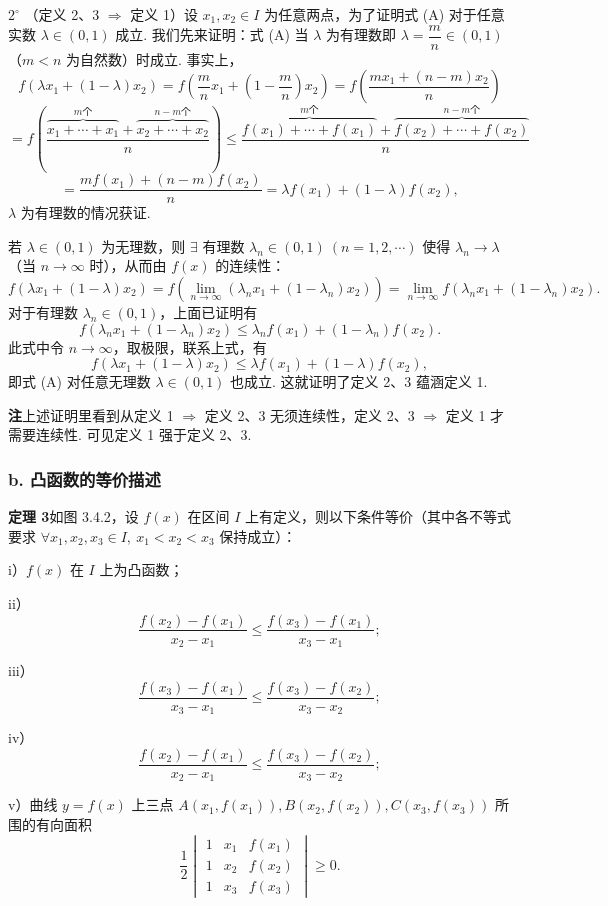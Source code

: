 \documentclass[UTF8, 12pt, fontset=fandol, oneside]{ctexart}
\begin{document}
$2^\circ$ （定义 2、3 $\Rightarrow$ 定义 1）设 $x_1,x_2\in I$ 为任意两点，为了证明式 (A) 对于任意实数 $\lambda\in(0,1)$ 成立. 我们先来证明：式 (A) 当 $\lambda$ 为有理数即 $\lambda=\dfrac mn\in(0,1)$（$m<n$ 为自然数）时成立. 事实上，
\[
  f(\lambda x_1+(1-\lambda)x_2)
  =f\left(\frac mn x_1+\left(1-\frac mn\right)x_2\right)
  =f\left(\frac{mx_1+(n-m)x_2}{n}\right)
\]
\[
  =f\left(\frac{\overbrace{x_1+\cdots+x_1}^{m\text{个}}+\overbrace{x_2+\cdots+x_2}^{n-m\text{个}}}{n}\right)
  \le\frac{\overbrace{f(x_1)+\cdots+f(x_1)}^{m\text{个}}+\overbrace{f(x_2)+\cdots+f(x_2)}^{n-m\text{个}}}{n}
\]
\[
  =\frac{mf(x_1)+(n-m)f(x_2)}{n}
  =\lambda f(x_1)+(1-\lambda)f(x_2),
\]
$\lambda$ 为有理数的情况获证.

若 $\lambda\in(0,1)$ 为无理数，则 $\exists$ 有理数 $\lambda_n\in(0,1)\ (n=1,2,\cdots)$ 使得 $\lambda_n\to\lambda$（当 $n\to\infty$ 时），从而由 $f(x)$ 的连续性：
\[
  f(\lambda x_1+(1-\lambda)x_2)
  =f\left(\lim_{n\to\infty}(\lambda_nx_1+(1-\lambda_n)x_2)\right)
  =\lim_{n\to\infty}f(\lambda_nx_1+(1-\lambda_n)x_2).
\]
对于有理数 $\lambda_n\in(0,1)$，上面已证明有
\[
  f(\lambda_nx_1+(1-\lambda_n)x_2)
  \le \lambda_n f(x_1)+(1-\lambda_n)f(x_2).
\]
此式中令 $n\to\infty$，取极限，联系上式，有
\[
  f(\lambda x_1+(1-\lambda)x_2)
  \le \lambda f(x_1)+(1-\lambda)f(x_2),
\]
即式 (A) 对任意无理数 $\lambda\in(0,1)$ 也成立. 这就证明了定义 2、3 蕴涵定义 1.

\noindent\textbf{注}\quad 上述证明里看到从定义 1 $\Rightarrow$ 定义 2、3 无须连续性，定义 2、3 $\Rightarrow$ 定义 1 才需要连续性. 可见定义 1 强于定义 2、3.

\subsubsection*{b. 凸函数的等价描述}

\noindent\textbf{定理 3}\quad 如图 3.4.2，设 $f(x)$ 在区间 $I$ 上有定义，则以下条件等价（其中各不等式要求 $\forall x_1,x_2,x_3\in I,\ x_1<x_2<x_3$ 保持成立）：

i）$f(x)$ 在 $I$ 上为凸函数；

ii）
\[
  \frac{f(x_2)-f(x_1)}{x_2-x_1}
  \le \frac{f(x_3)-f(x_1)}{x_3-x_1};
\]

iii）
\[
  \frac{f(x_3)-f(x_1)}{x_3-x_1}
  \le \frac{f(x_3)-f(x_2)}{x_3-x_2};
\]

iv）
\[
  \frac{f(x_2)-f(x_1)}{x_2-x_1}
  \le \frac{f(x_3)-f(x_2)}{x_3-x_2};
\]

v）曲线 $y=f(x)$ 上三点 $A(x_1,f(x_1)),B(x_2,f(x_2)),C(x_3,f(x_3))$ 所围的有向面积
\[
  \frac12
  \begin{vmatrix}
  1&x_1&f(x_1)\\
  1&x_2&f(x_2)\\
  1&x_3&f(x_3)
  \end{vmatrix}\ge0.
\]
\end{document}
